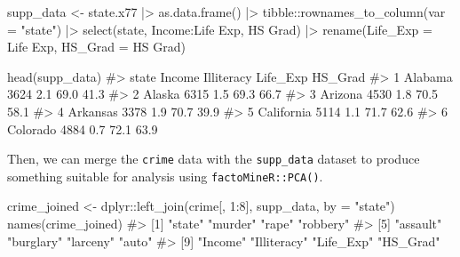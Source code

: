 \documentclass[
  letterpaper,
  10pt,
  krantz2]{krantz}
\makeatletter
\newenvironment{Shaded}{\begin{snugshade}}{\end{snugshade}}
\newcommand{\AttributeTok}[1]{\textcolor[rgb]{0.40,0.45,0.13}{#1}}
\newcommand{\CommentTok}[1]{\textcolor[rgb]{0.37,0.37,0.37}{#1}}
\newcommand{\DecValTok}[1]{\textcolor[rgb]{0.68,0.00,0.00}{#1}}
\newcommand{\FunctionTok}[1]{\textcolor[rgb]{0.28,0.35,0.67}{#1}}
\newcommand{\NormalTok}[1]{\textcolor[rgb]{0.00,0.23,0.31}{#1}}
\newcommand{\OtherTok}[1]{\textcolor[rgb]{0.00,0.23,0.31}{#1}}
\newcommand{\SpecialCharTok}[1]{\textcolor[rgb]{0.37,0.37,0.37}{#1}}
\newcommand{\StringTok}[1]{\textcolor[rgb]{0.13,0.47,0.30}{#1}}
\newenvironment{kframe}{%
  \medskip{}
  \setlength{\fboxsep}{.8em}
  \def\at@end@of@kframe{}%
  \ifinner\ifhmode%
  \def\at@end@of@kframe{\end{minipage}}%
  \begin{minipage}{\columnwidth}%
  \fi\fi%
  \def\FrameCommand##1{\hskip\@totalleftmargin \hskip-\fboxsep
  \colorbox{shadecolor}{##1}\hskip-\fboxsep
      \hskip-\linewidth \hskip-\@totalleftmargin \hskip\columnwidth}%
  \MakeFramed {\advance\hsize-\width
    \@totalleftmargin\z@ \linewidth\hsize
    \@setminipage}}%
{\par\unskip\endMakeFramed%
  \at@end@of@kframe}
\renewenvironment{Shaded}{\begin{kframe}}{\end{kframe}}
\makeatother
\begin{document}
\begin{Shaded}
\begin{Highlighting}[]
\NormalTok{supp\_data }\OtherTok{\textless{}{-}}\NormalTok{ state.x77 }\SpecialCharTok{|\textgreater{}}
  \FunctionTok{as.data.frame}\NormalTok{() }\SpecialCharTok{|\textgreater{}}
\NormalTok{  tibble}\SpecialCharTok{::}\FunctionTok{rownames\_to\_column}\NormalTok{(}\AttributeTok{var =} \StringTok{"state"}\NormalTok{) }\SpecialCharTok{|\textgreater{}}
  \FunctionTok{select}\NormalTok{(state, Income}\SpecialCharTok{:}\StringTok{\textasciigrave{}}\AttributeTok{Life Exp}\StringTok{\textasciigrave{}}\NormalTok{, }\StringTok{\textasciigrave{}}\AttributeTok{HS Grad}\StringTok{\textasciigrave{}}\NormalTok{) }\SpecialCharTok{|\textgreater{}}
  \FunctionTok{rename}\NormalTok{(}\AttributeTok{Life\_Exp =} \StringTok{\textasciigrave{}}\AttributeTok{Life Exp}\StringTok{\textasciigrave{}}\NormalTok{,}
         \AttributeTok{HS\_Grad =} \StringTok{\textasciigrave{}}\AttributeTok{HS Grad}\StringTok{\textasciigrave{}}\NormalTok{)}

\FunctionTok{head}\NormalTok{(supp\_data)}
\CommentTok{\#\textgreater{}        state Income Illiteracy Life\_Exp HS\_Grad}
\CommentTok{\#\textgreater{} 1    Alabama   3624        2.1     69.0    41.3}
\CommentTok{\#\textgreater{} 2     Alaska   6315        1.5     69.3    66.7}
\CommentTok{\#\textgreater{} 3    Arizona   4530        1.8     70.5    58.1}
\CommentTok{\#\textgreater{} 4   Arkansas   3378        1.9     70.7    39.9}
\CommentTok{\#\textgreater{} 5 California   5114        1.1     71.7    62.6}
\CommentTok{\#\textgreater{} 6   Colorado   4884        0.7     72.1    63.9}
\end{Highlighting}
\end{Shaded}

Then, we can merge the \texttt{crime} data with the \texttt{supp\_data}
dataset to produce something suitable for analysis using
\texttt{factoMineR::PCA()}.

\begin{Shaded}
\begin{Highlighting}[]
\NormalTok{crime\_joined }\OtherTok{\textless{}{-}}
\NormalTok{  dplyr}\SpecialCharTok{::}\FunctionTok{left\_join}\NormalTok{(crime[, }\DecValTok{1}\SpecialCharTok{:}\DecValTok{8}\NormalTok{], supp\_data, }\AttributeTok{by =} \StringTok{"state"}\NormalTok{)}
\FunctionTok{names}\NormalTok{(crime\_joined)}
\CommentTok{\#\textgreater{}  [1] "state"      "murder"     "rape"       "robbery"   }
\CommentTok{\#\textgreater{}  [5] "assault"    "burglary"   "larceny"    "auto"      }
\CommentTok{\#\textgreater{}  [9] "Income"     "Illiteracy" "Life\_Exp"   "HS\_Grad"}
\end{Highlighting}
\end{Shaded}
\end{document}
